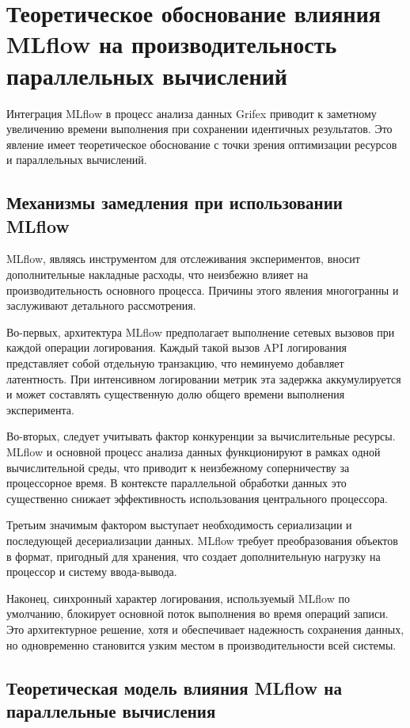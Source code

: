 \section{Теоретическое обоснование влияния MLflow на производительность параллельных вычислений}

Интеграция MLflow в процесс анализа данных Grifex приводит к заметному
увеличению времени выполнения при сохранении идентичных результатов. Это явление
имеет теоретическое обоснование с точки зрения оптимизации ресурсов и
параллельных вычислений.

\subsection{Механизмы замедления при использовании MLflow}

MLflow, являясь инструментом для отслеживания экспериментов, вносит
дополнительные накладные расходы, что неизбежно влияет на производительность
основного процесса. Причины этого явления многогранны и заслуживают детального
рассмотрения.

Во-первых, архитектура MLflow предполагает выполнение сетевых вызовов при каждой
операции логирования. Каждый такой вызов API логирования представляет собой
отдельную транзакцию, что неминуемо добавляет латентность. При интенсивном
логировании метрик эта задержка аккумулируется и может составлять
существенную долю общего времени выполнения эксперимента.

Во-вторых, следует учитывать фактор конкуренции за вычислительные ресурсы.
MLflow и основной процесс анализа данных функционируют в рамках одной
вычислительной среды, что приводит к неизбежному соперничеству за процессорное
время. В контексте параллельной обработки данных это существенно снижает
эффективность использования центрального процессора.

Третьим значимым фактором выступает необходимость сериализации и последующей
десериализации данных. MLflow требует преобразования объектов в формат,
пригодный для хранения, что создает дополнительную нагрузку на процессор и
систему ввода-вывода.

Наконец, синхронный характер логирования, используемый MLflow по умолчанию,
блокирует основной поток выполнения во время операций записи. Это архитектурное
решение, хотя и обеспечивает надежность сохранения данных, но одновременно
становится узким местом в производительности всей системы.

\subsection{Теоретическая модель влияния MLflow на параллельные вычисления}

